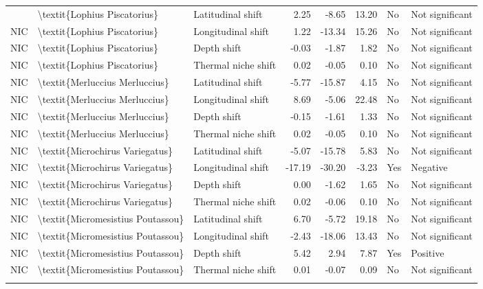 \begin{longtable}[t]{lllrrrll}
{{\addlinespace
NIC & \textbackslash{}textit\{Lophius Piscatorius\} & Latitudinal shift & 2.25 & -8.65 & 13.20 & No & Not significant\\
NIC & \textbackslash{}textit\{Lophius Piscatorius\} & Longitudinal shift & 1.22 & -13.34 & 15.26 & No & Not significant\\
NIC & \textbackslash{}textit\{Lophius Piscatorius\} & Depth shift & -0.03 & -1.87 & 1.82 & No & Not significant\\
NIC & \textbackslash{}textit\{Lophius Piscatorius\} & Thermal niche shift & 0.02 & -0.05 & 0.10 & No & Not significant\\
NIC & \textbackslash{}textit\{Merluccius Merluccius\} & Latitudinal shift & -5.77 & -15.87 & 4.15 & No & Not significant\\
\addlinespace
NIC & \textbackslash{}textit\{Merluccius Merluccius\} & Longitudinal shift & 8.69 & -5.06 & 22.48 & No & Not significant\\
NIC & \textbackslash{}textit\{Merluccius Merluccius\} & Depth shift & -0.15 & -1.61 & 1.33 & No & Not significant\\
NIC & \textbackslash{}textit\{Merluccius Merluccius\} & Thermal niche shift & 0.02 & -0.05 & 0.10 & No & Not significant\\
NIC & \textbackslash{}textit\{Microchirus Variegatus\} & Latitudinal shift & -5.07 & -15.78 & 5.83 & No & Not significant\\
NIC & \textbackslash{}textit\{Microchirus Variegatus\} & Longitudinal shift & -17.19 & -30.20 & -3.23 & Yes & Negative\\
\addlinespace
NIC & \textbackslash{}textit\{Microchirus Variegatus\} & Depth shift & 0.00 & -1.62 & 1.65 & No & Not significant\\
NIC & \textbackslash{}textit\{Microchirus Variegatus\} & Thermal niche shift & 0.02 & -0.06 & 0.10 & No & Not significant\\
NIC & \textbackslash{}textit\{Micromesistius Poutassou\} & Latitudinal shift & 6.70 & -5.72 & 19.18 & No & Not significant\\
NIC & \textbackslash{}textit\{Micromesistius Poutassou\} & Longitudinal shift & -2.43 & -18.06 & 13.43 & No & Not significant\\
NIC & \textbackslash{}textit\{Micromesistius Poutassou\} & Depth shift & 5.42 & 2.94 & 7.87 & Yes & Positive\\
\addlinespace
NIC & \textbackslash{}textit\{Micromesistius Poutassou\} & Thermal niche shift & 0.01 & -0.07 & 0.09 & No & Not significant\\
}}
\end{longtable}
